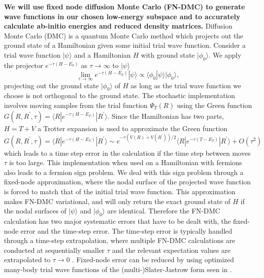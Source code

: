 \documentclass{article}
\begin{document}
\textbf{We will use fixed node diffusion Monte Carlo (FN-DMC) to generate
wave functions in our chosen low-energy subspace and to accurately calculate ab-initio energies and reduced density matrices. }
Diffusion Monte Carlo (DMC) is a quantum Monte Carlo method which projects out the ground state of a Hamiltonian given some initial trial wave function. 
Consider a trial wave function $|\psi\rangle$ and a Hamiltonian $H$ with ground state $|\phi_0\rangle$. 
We apply the projector $e^{-\tau (H-E_0)}$ as $\tau \rightarrow \infty$ to $|\psi \rangle$
\begin{equation}
\lim_{\tau \rightarrow \infty} e^{-\tau (H-E_0)} |\psi\rangle \propto \langle \phi_0|\psi\rangle |\phi_0\rangle,
\end{equation}
projecting out the ground state $|\phi_0\rangle$ of $H$ as long as the trial wave function we choose is not orthogonal to the ground state. 
The stochastic implementation involves moving samples from the trial function $\Psi_T(R)$ using the Green function $G(R, R^\prime, \tau) = \langle R | e^{-\tau(H - E_T)} | R^\prime \rangle$. 
Since the Hamiltonian has two parts, $H = T + V$ a Trotter expansion is used to approximate the Green function $G(R, R^\prime, \tau) = \langle R | e^{-\tau(H - E_T)} | R^\prime \rangle \sim e^{-\tau(V(R) + V(R^\prime))/2} \langle R| e^{-\tau(T - E_T)}|R^\prime \rangle + O(\tau^2) $ which leads to a time step error in the calculation if the time step between moves $\tau$ is too large. 
This implementation when used on a Hamiltonian with fermions also leads to a fermion sign problem. 
We deal with this sign problem through a fixed-node approximation, where the nodal surface of the projected wave function is forced to match that of the initial trial wave function. 
This approximation makes FN-DMC variational, and will only return the exact ground state of $H$ if the nodal surfaces of $|\psi\rangle$ and $|\phi_0\rangle$ are identical. 
Therefore the FN-DMC calculation has two major systematic errors that have to be dealt with, the fixed-node error and the time-step error. 
The time-step error is typically handled through a time-step extrapolation, where multiple FN-DMC calculations are conducted at sequentially smaller $\tau$ and the relevant expectation values are extrapolated to $\tau \rightarrow 0$ \cite{Needs2010}. 
Fixed-node error can be reduced by using optimized many-body trial wave functions of the (multi-)Slater-Jastrow form seen in \cite{PhysRevLett.98.110201}.
\end{document}
